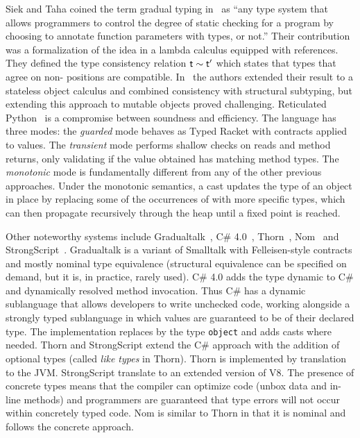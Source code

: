 \documentclass[USenglish]{tex/lipics-v2016}
\begin{document}
Siek and Taha coined the term gradual typing in~\cite{SiekTaha06} as ``any
type system that allows programmers to control the degree of static checking
for a program by choosing to annotate function parameters with types, or
not.'' Their contribution was a formalization of the idea in a lambda
calculus equipped with references. They defined the type consistency
relation $\t \sim \tp$ which states that types that agree on non-\any
positions are compatible.  In~\cite{SiekTaha07} the authors extended their
result to a stateless object calculus and combined consistency with
structural subtyping, but extending this approach to mutable objects proved
challenging. Reticulated Python~\cite{siek14} is a compromise between
soundness and efficiency.  The language has three modes: the \emph{guarded}
mode behaves as Typed Racket with contracts applied to values.  The
\emph{transient} mode performs shallow checks on reads and method returns,
only validating if the value obtained has matching method types.  The
\emph{monotonic} mode is fundamentally different from any of the other
previous approaches. Under the monotonic semantics, a cast updates the type
of an object in place by replacing some of the occurrences of \any with more
specific types, which can then propagate recursively through the heap until
a fixed point is reached.

Other noteworthy systems include Gradualtalk~\cite{GS13}, C\#
4.0~\cite{Bierman10}, Thorn~\cite{oopsla09}, Nom~\cite{Muehlboeck2017} and
Strong\-Script~\cite{ecoop15}. Gradualtalk is a variant of Smalltalk with
Felleisen-style contracts and mostly nominal type equivalence (structural
equivalence can be specified on demand, but it is, in practice, rarely
used). C\# 4.0 adds the type {\sf dynamic} to C\# and dynamically resolved
method invocation. Thus C\# has a dynamic sublanguage that allows developers
to write unchecked code, working alongside a strongly typed sublanguage in
which values are guaranteed to be of their declared type.  The
implementation replaces \any by the type {\tt object} and adds casts where
needed.  Thorn and StrongScript extend the C\# approach with the addition of
optional types (called {\em like types} in Thorn).  Thorn is implemented by
translation to the JVM. StrongScript translate to an extended version of
V8. The presence of concrete types means that the compiler can optimize code
(unbox data and in-line methods) and programmers are guaranteed that type
errors will not occur within concretely typed code. Nom is similar to Thorn
in that it is nominal and follows the concrete approach.
\end{document}

